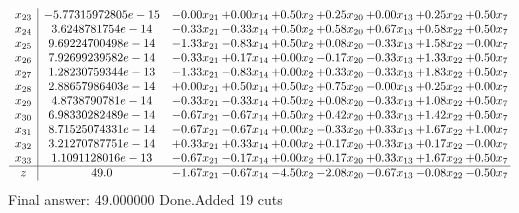 \documentclass[8pt]{article}
\begin{document}
\[\begin{array}{c| c c@{\hskip 2pt} c@{\hskip 2pt} c@{\hskip 2pt} c@{\hskip 2pt} c@{\hskip 2pt} c@{\hskip 2pt} c@{\hskip 2pt} }
 x_{23}   &  -5.77315972805e-15 & -0.00 x_{21} & +  0.00 x_{14} & +  0.50 x_{2} & +  0.25 x_{20} & +  0.00 x_{13} & +  0.25 x_{22} & +  0.50 x_{7}\\
 x_{24}   &  3.6248781754e-14 & -0.33 x_{21} & -0.33 x_{14} & +  0.50 x_{2} & +  0.58 x_{20} & +  0.67 x_{13} & +  0.58 x_{22} & +  0.50 x_{7}\\
 x_{25}   &  9.69224700498e-14 & -1.33 x_{21} & -0.83 x_{14} & +  0.50 x_{2} & +  0.08 x_{20} & -0.33 x_{13} & +  1.58 x_{22} & -0.00 x_{7}\\
 x_{26}   &  7.92699239582e-14 & -0.33 x_{21} & +  0.17 x_{14} & +  0.00 x_{2} & -0.17 x_{20} & -0.33 x_{13} & +  1.33 x_{22} & +  0.50 x_{7}\\
 x_{27}   &  1.28230759344e-13 & -1.33 x_{21} & -0.83 x_{14} & +  0.00 x_{2} & +  0.33 x_{20} & -0.33 x_{13} & +  1.83 x_{22} & +  0.50 x_{7}\\
 x_{28}   &  2.88657986403e-14 & +  0.00 x_{21} & +  0.50 x_{14} & +  0.50 x_{2} & +  0.75 x_{20} & -0.00 x_{13} & +  0.25 x_{22} & +  0.00 x_{7}\\
 x_{29}   &  4.8738790781e-14 & -0.33 x_{21} & -0.33 x_{14} & +  0.50 x_{2} & +  0.08 x_{20} & -0.33 x_{13} & +  1.08 x_{22} & +  0.50 x_{7}\\
 x_{30}   &  6.98330282489e-14 & -0.67 x_{21} & -0.67 x_{14} & +  0.50 x_{2} & +  0.42 x_{20} & +  0.33 x_{13} & +  1.42 x_{22} & +  0.50 x_{7}\\
 x_{31}   &  8.71525074331e-14 & -0.67 x_{21} & -0.67 x_{14} & +  0.00 x_{2} & -0.33 x_{20} & +  0.33 x_{13} & +  1.67 x_{22} & +  1.00 x_{7}\\
 x_{32}   &  3.21270787751e-14 & +  0.33 x_{21} & +  0.33 x_{14} & +  0.00 x_{2} & +  0.17 x_{20} & +  0.33 x_{13} & +  0.17 x_{22} & -0.00 x_{7}\\
 x_{33}   &  1.1091128016e-13 & -0.67 x_{21} & -0.17 x_{14} & +  0.00 x_{2} & +  0.17 x_{20} & +  0.33 x_{13} & +  1.67 x_{22} & +  0.50 x_{7}\\
\hline
z    &  49.0 & -1.67 x_{21} & -0.67 x_{14} & -4.50 x_{2} & -2.08 x_{20} & -0.67 x_{13} & -0.08 x_{22} & -0.50 x_{7}\\
\end{array}\]
 Final answer: 49.000000 
Done.Added 19 cuts 
\end{document}
